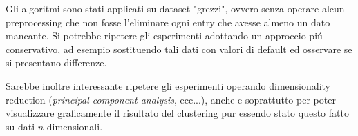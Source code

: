 \documentclass[12pt]{report}
\begin{document}
		Gli algoritmi sono stati applicati su dataset "grezzi", ovvero
		senza operare alcun preprocessing che non fosse l'eliminare ogni
		entry che avesse almeno un dato mancante. Si potrebbe ripetere
		gli esperimenti adottando un approccio piú conservativo, ad
		esempio sostituendo tali dati con valori di default ed osservare
		se si presentano differenze.

		Sarebbe inoltre interessante ripetere gli esperimenti operando
		dimensionality reduction (\textit{principal component analysis},
		ecc...), anche e soprattutto per poter visualizzare graficamente
		il risultato del clustering pur essendo stato questo fatto su
		dati $n$-dimensionali.

	\printbibliography
\end{document}
